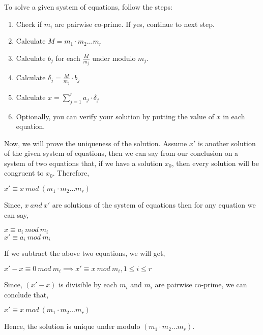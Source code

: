 \documentclass[11pt]{article}
\begin{document}
To solve a given system of equations, follow the steps:
\begin{enumerate}
    \item Check if $m_i$ are pairwise co-prime. If yes, continue to next step.
    \item Calculate $M = m_1 \cdot m_2 \hdots m_r$
    \item Calculate $b_j$ for each $\frac{M}{m_j}$ under modulo $m_j$.
    \item Calculate $\delta_j = \frac{M}{m_j} \cdot b_j$
    \item Calculate $x = \sum_{j=1}^r a_j \cdot \delta_j$
    \item Optionally, you can verify your solution by putting the value of $x$ in each equation.
\end{enumerate}
Now, we will prove the uniqueness of the solution. Assume $x'$ is another solution of the given system of equations, then we can say from our conclusion on a system of two equations that, if we have a solution $x_0$, then every solution will be congruent to $x_0$. Therefore, 
\begin{center}
    $x' \equiv x \ mod \ (m_1 \cdot m_2 \hdots m_r)$
\end{center}
Since, $x \ and \ x'$ are solutions of the system of equations then for any equation we can say,
\begin{center}
    $x \equiv a_i \ mod \ m_i$\\
    $x' \equiv a_i \ mod \ m_i$
\end{center}
If we subtract the above two equations, we will get,
\begin{center}
    $x' - x \equiv 0 \ mod \ m_i \implies x' \equiv x \ mod \ m_i, 1 \leq i \leq r$
\end{center}
Since, $(x' - x)$ is divisible by each $m_i$ and $m_i$ are pairwise co-prime, we can conclude that,
\begin{center}
    $x' \equiv x \ mod \ (m_1 \cdot m_2 \hdots m_r)$
\end{center}
Hence, the solution is unique under modulo $(m_1 \cdot m_2 \hdots m_r)$.
\end{document}

